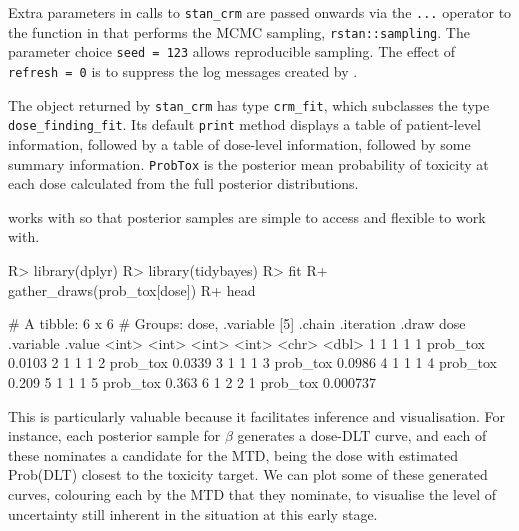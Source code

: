 \documentclass[article]{jss}
\begin{document}
Extra parameters in calls to \texttt{stan\_crm} are passed onwards via
the \texttt{...} operator to the function in  that performs
the MCMC sampling, \texttt{rstan::sampling}. The parameter choice
\texttt{seed\ =\ 123} allows reproducible sampling. The effect of
\texttt{refresh\ =\ 0} is to suppress the log messages created by
.

The object returned by \texttt{stan\_crm} has type \texttt{crm\_fit},
which subclasses the type \texttt{dose\_finding\_fit}. Its default
\texttt{print} method displays a table of patient-level information,
followed by a table of dose-level information, followed by some summary
information. \texttt{ProbTox} is the posterior mean probability of
toxicity at each dose calculated from the full posterior distributions.

 works with  \citep{tidybayes} so that
posterior samples are simple to access and flexible to work with.

\begin{CodeChunk}

\begin{CodeInput}
R> library(dplyr)
R> library(tidybayes)
R> fit %
R+   gather_draws(prob_tox[dose]) %
R+   head
\end{CodeInput}

\begin{CodeOutput}
# A tibble: 6 x 6
# Groups:   dose, .variable [5]
  .chain .iteration .draw  dose .variable   .value
   <int>      <int> <int> <int> <chr>        <dbl>
1      1          1     1     1 prob_tox  0.0103  
2      1          1     1     2 prob_tox  0.0339  
3      1          1     1     3 prob_tox  0.0986  
4      1          1     1     4 prob_tox  0.209   
5      1          1     1     5 prob_tox  0.363   
6      1          2     2     1 prob_tox  0.000737
\end{CodeOutput}
\end{CodeChunk}

This is particularly valuable because it facilitates inference and
visualisation. For instance, each posterior sample for \(\beta\)
generates a dose-DLT curve, and each of these nominates a candidate for
the MTD, being the dose with estimated Prob(DLT) closest to the toxicity
target. We can plot some of these generated curves, colouring each by
the MTD that they nominate, to visualise the level of uncertainty still
inherent in the situation at this early stage.
\end{document}
